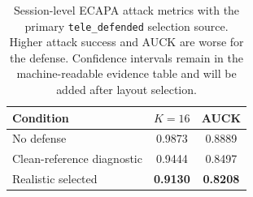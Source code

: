 \begin{table}[t]
  \centering
  \caption{Session-level ECAPA attack metrics with the primary
  \texttt{tele\_defended} selection source. Higher attack success and AUCK are
  worse for the defense. Confidence intervals remain in the machine-readable
  evidence table and will be added after layout selection.}
  \label{tab:main-security}
  \small
  \setlength{\tabcolsep}{4pt}
  \begin{tabular}{lcc}
    \toprule
    Condition & $K{=}16$ & AUCK \\
    \midrule
    No defense & 0.9873 & 0.8889 \\
    Clean-reference diagnostic & 0.9444 & 0.8497 \\
    Realistic selected & \textbf{0.9130} & \textbf{0.8208} \\
    \bottomrule
  \end{tabular}
\end{table}
